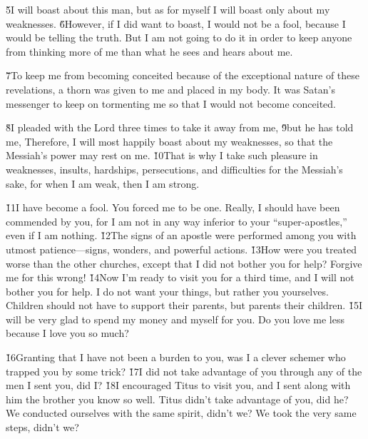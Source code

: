 \v{5}I will boast about this man, but as for myself I will boast only about my weaknesses. \v{6}However, if I did want to boast, I would not be a fool, because I would be telling the truth. But I am not going to do it in order to keep anyone from thinking more of me than what he sees and hears about me.

\v{7}To keep me from becoming conceited because of the exceptional nature of these revelations, a thorn was given to me and placed in my body. It was Satan's messenger to keep on tormenting me so that I would not become conceited.

\v{8}I pleaded with the Lord three times to take it away from me, \v{9}but he has told me,  Therefore, I will most happily boast about my weaknesses, so that the Messiah's power may rest on me. \v{10}That is why I take such pleasure in weaknesses, insults, hardships, persecutions, and difficulties for the Messiah's sake, for when I am weak, then I am strong.

\v{11}I have become a fool. You forced me to be one. Really, I should have been commended by you, for I am not in any way inferior to your ``super-apostles,'' even if I am nothing. \v{12}The signs of an apostle were performed among you with utmost patience---signs, wonders, and powerful actions. \v{13}How were you treated worse than the other churches, except that I did not bother you for help? Forgive me for this wrong! \v{14}Now I'm ready to visit you for a third time, and I will not bother you for help. I do not want your things, but rather you yourselves. Children should not have to support their parents, but parents their children. \v{15}I will be very glad to spend my money and myself for you. Do you love me less because I love you so much?

\v{16}Granting that I have not been a burden to you, was I a clever schemer who trapped you by some trick? \v{17}I did not take advantage of you through any of the men I sent you, did I? \v{18}I encouraged Titus to visit you, and I sent along with him the brother you know so well. Titus didn't take advantage of you, did he? We conducted ourselves with the same spirit, didn't we? We took the very same steps, didn't we?

